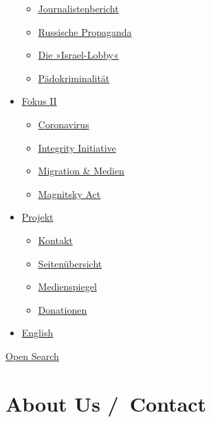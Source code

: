\begin{itemize}
  \begin{itemize}
  \tightlist
  \item
    \href{https://swprs.org/bericht-eines-journalisten/}{Journalistenbericht}
  \item
    \href{https://swprs.org/russische-propaganda/}{Russische Propaganda}
  \item
    \href{https://swprs.org/die-israel-lobby-fakten-und-mythen/}{Die
    »Israel-Lobby«}
  \item
    \href{https://swprs.org/geopolitik-und-paedokriminalitaet/}{Pädokriminalität}
  \end{itemize}
\item
  \href{https://swprs.org/migration-und-medien/}{Fokus II}

  \begin{itemize}
  \tightlist
  \item
    \href{https://swprs.org/covid-19-hinweis-ii/}{Coronavirus}
  \item
    \href{https://swprs.org/die-integrity-initiative/}{Integrity
    Initiative}
  \item
    \href{https://swprs.org/migration-und-medien/}{Migration \& Medien}
  \item
    \href{https://swprs.org/der-fall-magnitsky/}{Magnitsky Act}
  \end{itemize}
\item
  \href{https://swprs.org/kontakt/}{Projekt}

  \begin{itemize}
  \tightlist
  \item
    \href{https://swprs.org/kontakt/}{Kontakt}
  \item
    \href{https://swprs.org/uebersicht/}{Seitenübersicht}
  \item
    \href{https://swprs.org/medienspiegel/}{Medienspiegel}
  \item
    \href{https://swprs.org/donationen/}{Donationen}
  \end{itemize}
\item
  \href{https://swprs.org/contact/}{English}
\end{itemize}

\protect\hyperlink{}{Open Search}

\hypertarget{about-us--contact}{%
\section{About Us /~Contact}\label{about-us--contact}}

